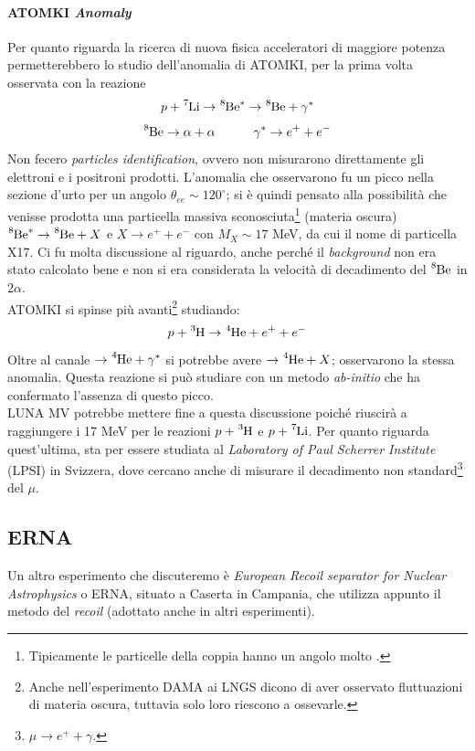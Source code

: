 \paragraph{ATOMKI \textit{Anomaly}} Per quanto riguarda la ricerca di nuova fisica acceleratori di maggiore potenza permetterebbero lo studio dell'anomalia di ATOMKI, per la prima volta osservata con la reazione
$$p+ \ce{^7Li} \to \ce{^8Be}^* \to \ce{^8Be} + \gamma^* $$
$$\ce{^8Be}\to \alpha + \alpha \qquad\quad \gamma^* \to e^+ + e^-$$
Non fecero \textit{particles identification}, ovvero non misurarono direttamente gli elettroni e i positroni prodotti. L'anomalia che osservarono fu un picco nella sezione d'urto per un angolo $\theta_{ee} \sim 120^{\circ}$; si è quindi pensato alla possibilità che venisse prodotta una particella massiva sconosciuta\footnote{Tipicamente le particelle della coppia hanno un angolo molto .} (materia oscura) $\ce{^8Be}^* \to \ce{^8Be} + X$ e $X\to e^+ + e^- $ con $M_X\sim 17$ MeV, da cui il nome di particella X17.
Ci fu molta discussione al riguardo, anche perché il \textit{background} non era stato calcolato bene e non si era considerata la velocità di decadimento del $\ce{^8Be}$ in $2\alpha$.\\
ATOMKI si spinse più avanti\footnote{Anche nell'esperimento DAMA ai LNGS dicono di aver osservato fluttuazioni di materia oscura, tuttavia solo loro riescono a ossevarle.} studiando:
$$p+\ce{^3H} \to \ce{^4He}+e^++e^-$$
Oltre al canale $\to \ce{^4He} +\gamma^*$ si potrebbe avere $\to \ce{^4He} + X$; osservarono la stessa anomalia. Questa reazione si può studiare con un metodo \textit{ab-initio} che ha confermato l'assenza di questo picco.\\
LUNA MV potrebbe mettere fine a questa discussione poiché riuscirà a raggiungere i 17 MeV per le reazioni $p+\ce{^3H}$ e $p+\ce{^7Li}$. Per quanto riguarda quest'ultima, sta per essere studiata al \textit{Laboratory of Paul Scherrer Institute} (LPSI) in Svizzera, dove cercano anche di misurare il decadimento non standard\footnote{$\mu\to e^+ + \gamma$.} del $\mu$.

\subsection{ERNA}
Un altro esperimento che discuteremo è \textit{European Recoil separator for Nuclear Astrophysics} o ERNA, situato a Caserta in Campania, che utilizza appunto il metodo del \textit{recoil} (adottato anche in altri esperimenti).

